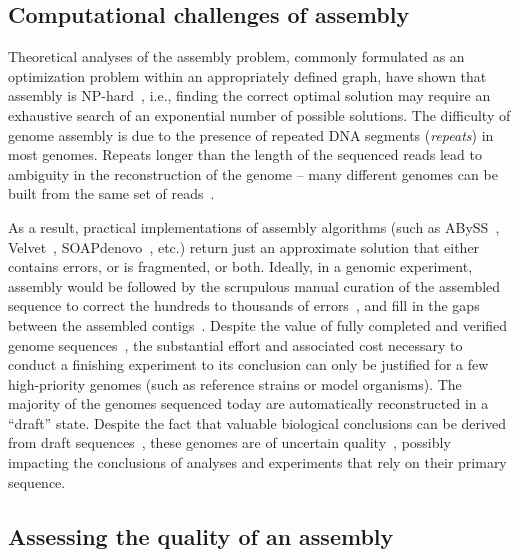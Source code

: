 \subsection{Computational challenges of assembly}

Theoretical analyses of the assembly problem, commonly formulated as
an optimization problem within an appropriately defined graph, have
shown that assembly is
NP-hard~\cite{myers1995,medvedev2007computability}, i.e., finding the
correct optimal solution may require an exhaustive search of an
exponential number of possible solutions.  The difficulty of genome
assembly is due to the presence of repeated DNA
segments (\emph{repeats}) in most genomes. Repeats longer than the length of the sequenced reads lead to ambiguity in the reconstruction of the genome
-- many different genomes can be built from the same set of
reads~\cite{nagarajan2009complexity,kingsford2010assembly}.

As a result, practical implementations of assembly algorithms (such as
ABySS~\cite{ABySS}, Velvet~\cite{Velvet},
SOAPdenovo~\cite{li2010novo}, etc.) return just an approximate
solution that either contains errors, or is fragmented, or both.
Ideally, in a genomic experiment, assembly would be followed by the
scrupulous manual curation of the assembled sequence to correct the
hundreds to thousands of errors~\cite{salzberg2005misassemblies}, and
fill in the gaps between the assembled
contigs~\cite{nagarajan2010finishing}. Despite the value of fully
completed and verified genome sequences~\cite{fraser2002value}, the
substantial effort and associated cost necessary to conduct a
finishing experiment to its conclusion can only be justified for a
few high-priority genomes (such as reference strains or model
organisms). The majority of the genomes sequenced today are
automatically reconstructed in a ``draft'' state.  Despite the fact
that valuable biological conclusions can be derived from draft
sequences~\cite{branscomb2002high}, these genomes are of uncertain
quality~\cite{chain2009genome}, possibly impacting the conclusions of
analyses and experiments that rely on their primary sequence.

\subsection{Assessing the quality of an assembly}


